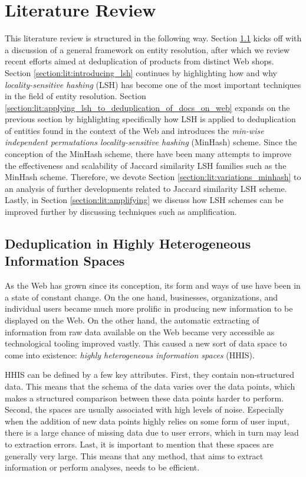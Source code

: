 \chapter{Literature Review}
\label{chap:lit_review}
This literature review is structured in the following way. Section \ref{section:lit:deduplication_in_hhs} kicks off with a discussion of a general framework on entity resolution, after which we review recent efforts aimed at deduplication of products from distinct Web shops. Section \ref{section:lit:introducing_lsh} continues by highlighting how and why \textit{locality-sensitive hashing} (LSH) has become one of the most important techniques in the field of entity resolution. Section \ref{section:lit:applying_lsh_to_deduplication_of_docs_on_web} expands on the previous section by highlighting specifically how LSH is applied to deduplication of entities found in the context of the Web and introduces the \textit{min-wise independent permutations locality-sensitive hashing} (MinHash) scheme. %
Since the conception of the MinHash scheme, there have been many attempts to improve the effectiveness and scalability of Jaccard similarity LSH families such as the MinHash scheme. Therefore, we devote Section \ref{section:lit:variations_minhash} to an analysis of further developments related to Jaccard similarity LSH scheme. Lastly, in Section \ref{section:lit:amplifying} we discuss how LSH schemes can be improved further by discussing techniques such as amplification.

\section{Deduplication in Highly Heterogeneous Information Spaces}
\label{section:lit:deduplication_in_hhs}
As the Web has grown since its conception, its form and ways of use have been in a state of constant change. On the one hand, businesses, organizations, and individual users became much more prolific in producing new information to be displayed on the Web. On the other hand, the automatic extracting of information from raw data available on the Web became very accessible as technological tooling improved vastly. This caused a new sort of data space to come into existence: \textit{highly heterogeneous information spaces} (HHIS).

HHIS can be defined by a few key attributes. First, they contain non-structured data. This means that the schema of the data varies over the data points, which makes a structured comparison between these data points harder to perform. Second, the spaces are usually associated with high levels of noise. Especially when the addition of new data points highly relies on some form of user input, there is a large chance of missing data due to user errors, which in turn may lead to extraction errors. Last, it is important to mention that these spaces are generally very large. This means that any method, that aims to extract information or perform analyses, needs to be efficient.

